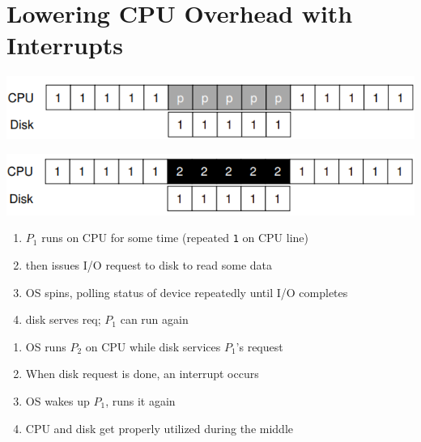 \section*{Lowering CPU Overhead with Interrupts}
\begin{minipage}{.5\linewidth}
\includegraphics[width=\linewidth]{imgs/iopolling}
\end{minipage}
\begin{minipage}{.5\linewidth}
\includegraphics[width=\linewidth]{imgs/iointerrupt}
\end{minipage}
\begin{minipage}{.5\linewidth}
  \flushleft
  \begin{enumerate}
  \item $P_1$ runs on CPU for some time (repeated \texttt{1} on CPU line)
  \item then issues I/O request to disk to read some data
  \item OS spins, polling status of device repeatedly until I/O completes
  \item disk serves req; $P_1$ can run again
  \end{enumerate}
\end{minipage}
\begin{minipage}{.5\linewidth}
  \flushleft
  \begin{enumerate}
  \item OS runs $P_2$ on CPU while disk services $P_1$'s request
  \item When disk request is done, an interrupt occurs
  \item OS wakes up $P_1$, runs it again
  \item {} CPU and disk get properly utilized during the middle
  \end{enumerate}
\end{minipage}
